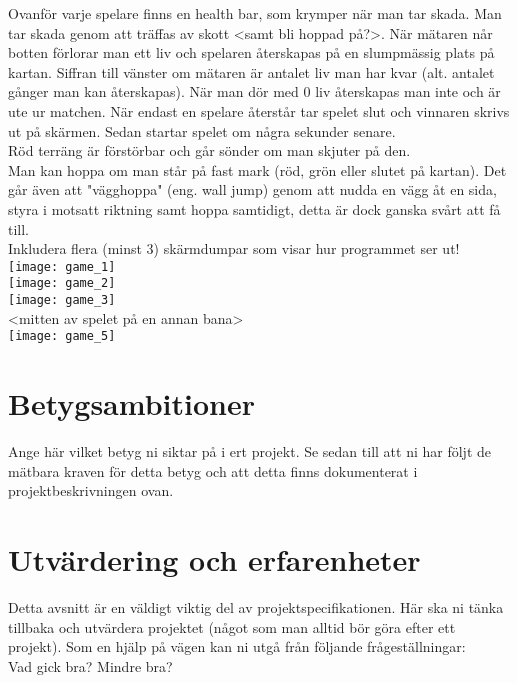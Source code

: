 \vspace{11pt}
Ovanför varje spelare finns en health bar, som krymper när man tar skada. Man tar skada genom att träffas av skott <samt bli hoppad på?>. När mätaren når botten förlorar man ett liv och spelaren återskapas på en slumpmässig plats på kartan. Siffran till vänster om mätaren är antalet liv man har kvar (alt. antalet gånger man kan återskapas). När man dör med 0 liv återskapas man inte och är ute ur matchen. När endast en spelare återstår tar spelet slut och vinnaren skrivs ut på skärmen. Sedan startar spelet om några sekunder senare.\\
\vspace{11pt}
Röd terräng är förstörbar och går sönder om man skjuter på den.\\
\vspace{11pt}
Man kan hoppa om man står på fast mark (röd, grön eller slutet på kartan). Det går även att "vägghoppa" (eng. wall jump) genom att nudda en vägg åt en sida, styra i motsatt riktning samt hoppa samtidigt, detta är dock ganska svårt att få till.\\
\vspace{11pt}
Inkludera flera (minst 3) skärmdumpar som visar hur programmet ser ut!\\
\texttt{[image: game\_1]}\\
\vspace{11pt}
\texttt{[image: game\_2]}\\
\vspace{11pt}
\texttt{[image: game\_3]}\\
\vspace{11pt}
<mitten av spelet på en annan bana>\\
\vspace{11pt}
\texttt{[image: game\_5]}\\
\section{Betygsambitioner}
{\color{red}Ange här vilket betyg ni siktar på i ert projekt.  Se sedan till att ni har följt de mätbara kraven för detta betyg och att detta finns dokumenterat i projektbeskrivningen ovan.\\}
\section{Utvärdering och erfarenheter}
{\color{red}Detta avsnitt är en väldigt viktig del av projektspecifikationen. Här ska ni tänka tillbaka och utvärdera projektet (något som man alltid bör göra efter ett projekt). Som en hjälp på vägen kan ni utgå från följande frågeställningar:\\
Vad gick bra? Mindre bra?\\}

